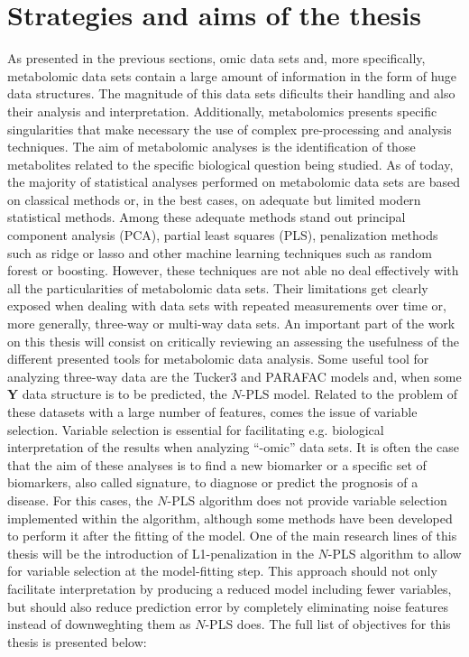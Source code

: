\section{Strategies and aims of the thesis}
\label{sec:strategiesthesis}
As presented in the previous sections, omic data sets and, more specifically, metabolomic data sets contain a large amount of information in the form of huge data structures. The magnitude of this data sets dificults their handling and also their analysis and interpretation. Additionally, metabolomics presents specific singularities that make necessary the use of complex pre-processing and analysis techniques. The aim of metabolomic analyses is the identification of those metabolites related to the specific biological question being studied. As of today, the majority of statistical analyses performed on metabolomic data sets are based on classical methods or, in the best cases, on adequate but limited modern statistical methods. Among these adequate methods stand out principal component analysis (PCA), partial least squares (PLS), penalization methods such as ridge or lasso and other machine learning techniques such as random forest or boosting. However, these techniques are not able no deal effectively with all the particularities of metabolomic data sets. Their limitations get clearly exposed when dealing with data sets with repeated measurements over time or, more generally, three-way or multi-way data sets. An important part of the work on this thesis will consist on critically reviewing an assessing the usefulness of the different presented tools for metabolomic data analysis. 
Some useful tool for analyzing three-way data are the Tucker3 and PARAFAC models and, when some \textbf{Y} data structure is to be predicted, the $N$-PLS model. Related to the problem of these datasets with a large number of features, comes the issue of variable selection. Variable selection is essential for facilitating e.g. biological interpretation of the results when analyzing “-omic” data sets. It is often the case that the aim of these analyses is to find a new biomarker or a specific set of biomarkers, also called signature, to diagnose or predict the prognosis of a disease. For this cases, the $N$-PLS algorithm does not provide variable selection implemented within the algorithm, although some methods have been developed to perform it after the fitting of the model. One of the main research lines of this thesis will be the introduction of L1-penalization in the $N$-PLS algorithm to allow for variable selection at the model-fitting step. This approach should not only facilitate interpretation by producing a reduced model including fewer variables, but should also reduce prediction error by completely eliminating noise features instead of downweghting them as $N$-PLS does. 
The full list of objectives for this thesis is presented below:

